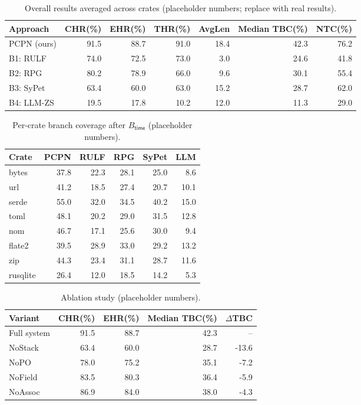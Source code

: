 \documentclass[sigconf]{acmart}
\begin{document}
\begin{table}[t]
\centering
\caption{Overall results averaged across crates (placeholder numbers; replace with real results).}
\label{tab:overall}
\begin{tabular}{lrrrrrr}
\hline
Approach & CHR(\%) & EHR(\%) & THR(\%) & AvgLen & Median TBC(\%) & NTC(\%) \\
\hline
PCPN (ours) & 91.5 & 88.7 & 91.0 & 18.4 & 42.3 & 76.2 \\
B1: RULF    & 74.0 & 72.5 & 73.0 &  3.0 & 24.6 & 41.8 \\
B2: RPG     & 80.2 & 78.9 & 66.0 &  9.6 & 30.1 & 55.4 \\
B3: SyPet & 63.4 & 60.0 & 63.0 & 15.2 & 28.7 & 62.0 \\
B4: LLM-ZS  & 19.5 & 17.8 & 10.2 & 12.0 & 11.3 & 29.0 \\
\hline
\end{tabular}
\end{table}

\begin{table}[t]
\centering
\caption{Per-crate branch coverage after $B_{\mathsf{time}}$ (placeholder numbers).}
\label{tab:coverage}
\begin{tabular}{lrrrrr}
\hline
Crate & PCPN & RULF & RPG & SyPet & LLM \\
\hline
bytes      & 37.8 & 22.3 & 28.1 & 25.0 &  8.6 \\
url        & 41.2 & 18.5 & 27.4 & 20.7 & 10.1 \\
serde & 55.0 & 32.0 & 34.5 & 40.2 & 15.0 \\
toml & 48.1 & 20.2 & 29.0 & 31.5 & 12.8 \\
nom        & 46.7 & 17.1 & 25.6 & 30.0 &  9.4 \\
flate2     & 39.5 & 28.9 & 33.0 & 29.2 & 13.2 \\
zip        & 44.3 & 23.4 & 31.1 & 28.7 & 11.6 \\
rusqlite   & 26.4 & 12.0 & 18.5 & 14.2 &  5.3 \\
\hline
\end{tabular}
\end{table}

\begin{table}[t]
\centering
\caption{Ablation study (placeholder numbers).}
\label{tab:ablation}
\begin{tabular}{lrrrr}
\hline
Variant & CHR(\%) & EHR(\%) & Median TBC(\%) & $\Delta$TBC \\
\hline
Full system & 91.5 & 88.7 & 42.3 & -- \\
NoStack & 63.4 & 60.0 & 28.7 & -13.6 \\
NoPO & 78.0 & 75.2 & 35.1 &  -7.2 \\
NoField & 83.5 & 80.3 & 36.4 &  -5.9 \\
NoAssoc & 86.9 & 84.0 & 38.0 &  -4.3 \\
\hline
\end{tabular}
\end{table}
\end{document}
